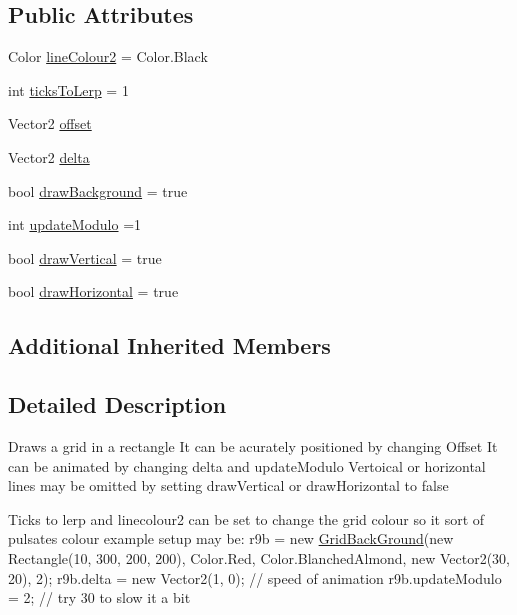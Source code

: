 \subsection*{Public Attributes}
\begin{DoxyCompactItemize}
\item 
Color \mbox{\hyperlink{class_r_c___framework_1_1_grid_back_ground_aea6b48adc0f7198e7e174272e27a38fc}{line\+Colour2}} = Color.\+Black
\item 
int \mbox{\hyperlink{class_r_c___framework_1_1_grid_back_ground_a70bd87e07cf3c796c46bfabbf5deb484}{ticks\+To\+Lerp}} = 1
\item 
Vector2 \mbox{\hyperlink{class_r_c___framework_1_1_grid_back_ground_a218136f423b8aa4b2bf9294628f3a9b7}{offset}}
\item 
Vector2 \mbox{\hyperlink{class_r_c___framework_1_1_grid_back_ground_a52aae8ab0c66a1ba7a83874828742c81}{delta}}
\item 
bool \mbox{\hyperlink{class_r_c___framework_1_1_grid_back_ground_a72db0e3bc139d962dd84d918f3f443b7}{draw\+Background}} = true
\item 
int \mbox{\hyperlink{class_r_c___framework_1_1_grid_back_ground_a3995a8339610de394109a7d00c91cf12}{update\+Modulo}} =1
\item 
bool \mbox{\hyperlink{class_r_c___framework_1_1_grid_back_ground_ad2dcba9e3bd46129cc3066fe7a4fafe4}{draw\+Vertical}} = true
\item 
bool \mbox{\hyperlink{class_r_c___framework_1_1_grid_back_ground_aaa1851c8b283367cc1d79bdb8c27ce32}{draw\+Horizontal}} = true
\end{DoxyCompactItemize}
\subsection*{Additional Inherited Members}


\subsection{Detailed Description}
Draws a grid in a rectangle It can be acurately positioned by changing Offset It can be animated by changing delta and update\+Modulo Vertoical or horizontal lines may be omitted by setting draw\+Vertical or draw\+Horizontal to false 

Ticks to lerp and linecolour2 can be set to change the grid colour so it sort of pulsates colour example setup may be\+: r9b = new \mbox{\hyperlink{class_r_c___framework_1_1_grid_back_ground}{Grid\+Back\+Ground}}(new Rectangle(10, 300, 200, 200), Color.\+Red, Color.\+Blanched\+Almond, new Vector2(30, 20), 2); r9b.\+delta = new Vector2(1, 0); // speed of animation r9b.\+update\+Modulo = 2; // try 30 to slow it a bit

